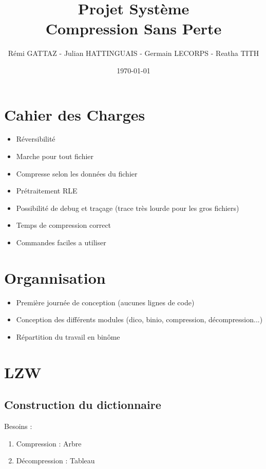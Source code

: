 \documentclass{beamer}
\title{
    Projet Système\\
    Compression Sans Perte
}
\author{Rémi GATTAZ - Julian HATTINGUAIS - Germain LECORPS - Reatha TITH}
\date{\today}
\begin{document}
\begin{frame}
\maketitle
\end{frame}

\begin{frame}
\tableofcontents
\end{frame}

\section{Cahier des Charges}

\begin{frame}
\begin{itemize}
\item Réversibilité
\item Marche pour tout fichier
\item Compresse selon les données du fichier
\item Prétraitement RLE
\item Possibilité de debug et traçage (trace très lourde pour les gros fichiers)
\item Temps de compression correct
\item Commandes faciles a utiliser
\end{itemize}
\end{frame}

\section{Organnisation}

\begin{frame}
\begin{itemize}
\item Première journée de conception (aucunes lignes de code)
\item Conception des différents modules (dico, binio, compression, décompression...)
\item Répartition du travail en binôme
\end{itemize}
\end{frame}


\section{LZW}

\subsection{Construction du dictionnaire}
\begin{frame}
 Besoins :
 \begin{enumerate}
  \item Compression : Arbre
  \item Décompression : Tableau
 \end{enumerate}
\end{frame}
\end{document}
